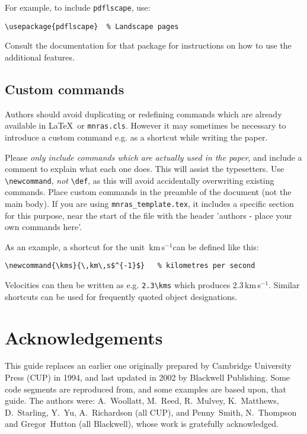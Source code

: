 \documentclass[fleqn,usenatbib,useAMS]{mnras}
\newcommand{\kms}{\,km\,s$^{-1}$} %
\begin{document}
For example, to include \verb'pdflscape', use:
\begin{verbatim}
\usepackage{pdflscape}	% Landscape pages
\end{verbatim}
Consult the documentation for that package for instructions on how to use the additional features.


\subsection{Custom commands}

Authors should avoid duplicating or redefining commands which are already available in \LaTeX\ or \verb'mnras.cls'.
However it may sometimes be necessary to introduce a custom command e.g. as a shortcut while writing the paper.

Please \emph{only include commands which are actually used in the paper}, and include a comment to explain what each one does.
This will assist the typesetters.
Use \verb'\newcommand', \emph{not} \verb'\def', as this will avoid accidentally overwriting existing commands.
Place custom commands in the preamble of the document (not the main body).
If you are using \texttt{mnras\_template.tex}, it includes a specific section for this purpose, near the start of the file with the header 'authors - place your own commands here'.

As an example, a shortcut for the unit \kms can be defined like this:
\begin{verbatim}
\newcommand{\kms}{\,km\,s$^{-1}$}	% kilometres per second
\end{verbatim}
Velocities can then be written as e.g. \verb'2.3\kms' which produces 2.3\kms.
Similar shortcuts can be used for frequently quoted object designations.


\section*{Acknowledgements}

This guide replaces an earlier one originally prepared by Cambridge University Press (CUP) in 1994, and last updated in 2002 by Blackwell Publishing.
Some code segments are reproduced from, and some examples are based upon, that guide.
The authors were: A.~Woollatt, M.~Reed, R.~Mulvey, K.~Matthews, D.~Starling, Y.~Yu, A.~Richardson (all CUP), and Penny~Smith, N.~Thompson and Gregor~Hutton (all Blackwell), whose work is gratefully acknowledged.
\end{document}
